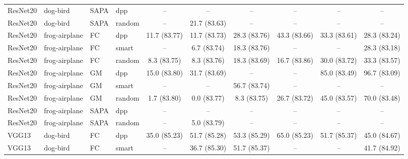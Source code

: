 \begin{table}[h]
{\begin{tabular}{llllcccccc}
ResNet20 & dog-bird & SAPA & dpp
& --
& --
& --
& --
& --
& -- \\



ResNet20 & dog-bird & SAPA & random
& --
& 21.7 \small{(83.63)}
& --
& --
& --
& -- \\ [1em]



ResNet20 & frog-airplane & FC & dpp
& 11.7 \small{(83.77)}
& 11.7 \small{(83.73)}
& 28.3 \small{(83.76)}
& 43.3 \small{(83.66)}
& 33.3 \small{(83.61)}
& 28.3 \small{(83.24)} \\

ResNet20 & frog-airplane & FC & smart
& --
& 6.7 \small{(83.74)}
& 18.3 \small{(83.76)}
& --
& --
& 28.3 \small{(83.18)} \\

ResNet20 & frog-airplane & FC & random
& 8.3 \small{(83.75)}
& 8.3 \small{(83.76)}
& 18.3 \small{(83.69)}
& 16.7 \small{(83.86)}
& 30.0 \small{(83.72)}
& 33.3 \small{(83.57)} \\ [1em]



ResNet20 & frog-airplane & GM & dpp
& 15.0 \small{(83.80)}
& 31.7 \small{(83.69)}
& --
& --
& 85.0 \small{(83.49)}
& 96.7 \small{(83.09)} \\

ResNet20 & frog-airplane & GM & smart
& --
& --
& 56.7 \small{(83.74)}
& --
& --
& -- \\

ResNet20 & frog-airplane & GM & random
& 1.7 \small{(83.80)}
& 0.0 \small{(83.77)}
& 8.3 \small{(83.75)}
& 26.7 \small{(83.72)}
& 45.0 \small{(83.57)}
& 70.0 \small{(83.48)} \\ [1em]

ResNet20 & frog-airplane & SAPA & dpp
& --
& --
& --
& --
& --
& -- \\



ResNet20 & frog-airplane & SAPA & random
& --
& 5.0 \small{(83.79)}
& --
& --
& --
& -- \\ [0.1em]


\hline





VGG13 & dog-bird & FC & dpp
& 35.0 \small{(85.23)}
& 51.7 \small{(85.28)}
& 53.3 \small{(85.29)}
& 65.0 \small{(85.23)}
& 51.7 \small{(85.37)}
& 45.0 \small{(84.67)} \\

VGG13 & dog-bird & FC & smart
& --
& 36.7 \small{(85.30)}
& 51.7 \small{(85.37)}
& --
& --
& 41.7 \small{(84.92)} \\


\end{tabular}}
\end{table}
